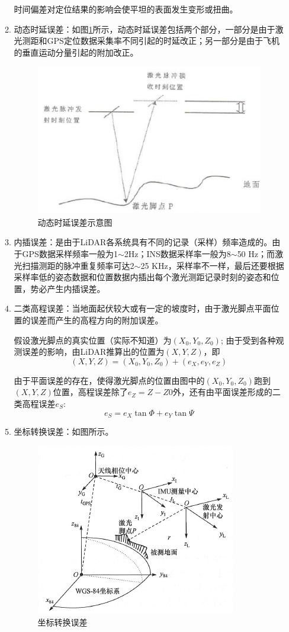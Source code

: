 \begin{enumerate}
\begin{enumerate}
		时间偏差对定位结果的影响会使平坦的表面发生变形或扭曲。
		\item {\cukai 动态时延误差}：如图\ref{fig:动态时延误差示意图}所示，动态时延误差包括两个部分，一部分是由于激光测距和GPS定位数据采集率不同引起的时延改正；另一部分是由于飞机的垂直运动分量引起的附加改正。
		\begin{figure}
			\centering
			\includegraphics[width=0.4\linewidth]{figure/Chapter8/动态时延误差示意图}
			\caption{动态时延误差示意图}
			\label{fig:动态时延误差示意图}
		\end{figure}
		\item {\cukai 内插误差}：是由于LiDAR各系统具有不同的记录（采样）频率造成的。由于GPS数据采样频率一般为1$ \sim $2Hz；INS数据采样率一般为8$ \sim $50 Hz；而激光扫描测距的脉冲重复频率可达2$ \sim $25 KHz，采样率不一样，最后还要根据采样率低的姿态数据和位置数据内插出每个激光测距记录时刻的姿态和位置，势必产生内插误差。
		\item {\cukai 二类高程误差}：当地面起伏较大或有一定的坡度时，由于激光脚点平面位置的误差而产生的高程方向的附加误差。
		
		假设激光脚点的真实位置（实际不知道）为$ (X_0,Y_0,Z_0) $; 由于受到各种观测误差的影响，由LiDAR推算出的位置为$ (X,Y,Z) $，即
		\begin{equation}
		(X,Y,Z) = (X_0,Y_0,Z_0) + (e_X,e_Y,e_Z)
		\end{equation}
		
		由于平面误差的存在，使得激光脚点的位置由图中的$ (X_0,Y_0,Z_0) $跑到$ (X,Y,Z) $位置，高程误差除了$ e_Z = Z - Z0 $外，还有由平面误差形成的二类高程误差$ e_S $:
		\begin{equation}
		e_S = e_X \tan \varPhi + e_Y \tan \varPsi
		\end{equation}
		\item {\cukai 坐标转换误差}：如图所示。
		\begin{figure}[htbp]
			\centering
			\includegraphics[width=0.4\linewidth]{figure/Chapter8/坐标转换误差}
			\caption{坐标转换误差}
			\label{fig:坐标转换误差}
		\end{figure}
	\end{enumerate} %
\end{enumerate} %

